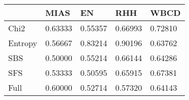 \begin{tabular}{|l|l|l|l|l|}
\toprule
{} &    MIAS &      EN &     RHH &    WBCD \\
\midrule
Chi2    & 0.63333 & 0.55357 & 0.66993 & 0.72810 \\
Entropy & 0.56667 & 0.83214 & 0.90196 & 0.63762 \\
SBS     & 0.50000 & 0.55214 & 0.66144 & 0.64286 \\
SFS     & 0.53333 & 0.50595 & 0.65915 & 0.67381 \\
Full    & 0.60000 & 0.52714 & 0.57320 & 0.64143 \\
\bottomrule
\end{tabular}
